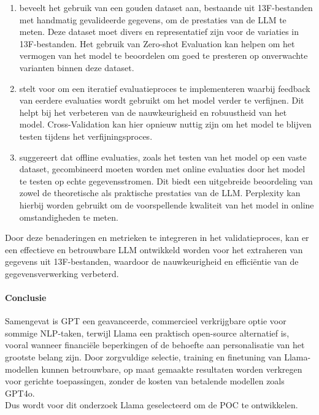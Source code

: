 \begin{enumerate}
    \item \textcite{Huang2024} beveelt het gebruik van een gouden dataset aan, bestaande uit 13F-bestanden met handmatig gevalideerde gegevens, om de prestaties van de LLM te meten. Deze dataset moet divers en representatief zijn voor de variaties in 13F-bestanden. Het gebruik van Zero-shot Evaluation kan helpen om het vermogen van het model te beoordelen om goed te presteren op onverwachte varianten binnen deze dataset.
    \item \textcite{Islam2024} stelt voor om een iteratief evaluatieproces te implementeren waarbij feedback van eerdere evaluaties wordt gebruikt om het model verder te verfijnen. Dit helpt bij het verbeteren van de nauwkeurigheid en robuustheid van het model. Cross-Validation kan hier opnieuw nuttig zijn om het model te blijven testen tijdens het verfijningsproces.
    \item \textcite{Islam2024} suggereert dat offline evaluaties, zoals het testen van het model op een vaste dataset, gecombineerd moeten worden met online evaluaties door het model te testen op echte gegevensstromen. Dit biedt een uitgebreide beoordeling van zowel de theoretische als praktische prestaties van de LLM. Perplexity kan hierbij worden gebruikt om de voorspellende kwaliteit van het model in online omstandigheden te meten.
\end{enumerate}
Door deze benaderingen en metrieken te integreren in het validatieproces, kan er een effectieve en betrouwbare LLM ontwikkeld worden voor het extraheren van gegevens uit 13F-bestanden, waardoor de nauwkeurigheid en efficiëntie van de gegevensverwerking verbeterd.




\paragraph{Conclusie}

Samengevat is GPT een geavanceerde, commercieel verkrijgbare optie voor sommige NLP-taken, terwijl Llama een praktisch open-source alternatief is, vooral wanneer financiële beperkingen of de behoefte aan personalisatie van het grootste belang zijn. Door zorgvuldige selectie, training en finetuning van Llama-modellen kunnen betrouwbare, op maat gemaakte resultaten worden verkregen voor gerichte toepassingen, zonder de kosten van betalende modellen zoals GPT4o.\\
Dus wordt voor dit onderzoek Llama geselecteerd om de POC te ontwikkelen.

